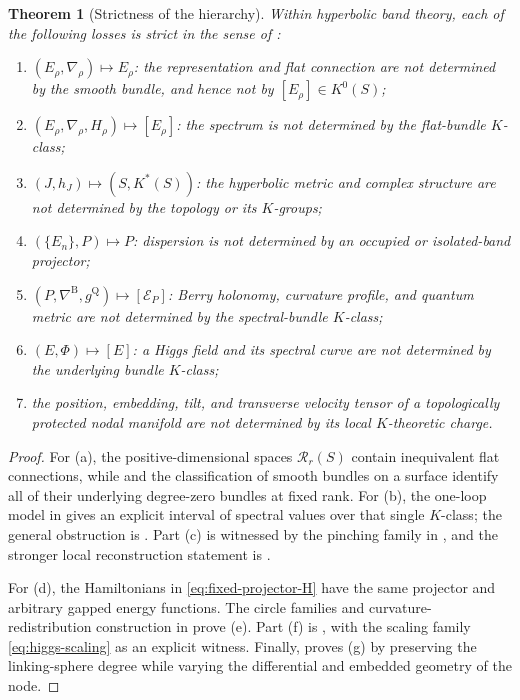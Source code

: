 \documentclass[11pt]{article}
\newtheorem{theorem}{Theorem}[section]
\theoremstyle{definition}
\theoremstyle{remark}
\newcommand{\cR}{\mathcal R}
\begin{document}
\begin{theorem}[Strictness of the hierarchy]
\label{thm:strict-hierarchy}
Within hyperbolic band theory, each of the following losses is strict in the
sense of :

\begin{enumerate}[label=\textup{(\alph*)},leftmargin=2.5em]
\item \((E_\rho,\nabla_\rho)\mapsto E_\rho\): the representation and flat
  connection are not determined by the smooth bundle, and hence not by
  \([E_\rho]\in K^0(S)\);
\item \((E_\rho,\nabla_\rho,H_\rho)\mapsto[E_\rho]\): the spectrum is not
  determined by the flat-bundle \(K\)-class;
\item \((J,h_J)\mapsto(S,K^*(S))\): the hyperbolic metric and complex
  structure are not determined by the topology or its \(K\)-groups;
\item \((\{E_n\},P)\mapsto P\): dispersion is not determined by an occupied
  or isolated-band projector;
\item \((P,\nabla^{\mathrm B},g^{\mathrm Q})\mapsto[\mathscr E_P]\): Berry
  holonomy, curvature profile, and quantum metric are not determined by the
  spectral-bundle \(K\)-class;
\item \((E,\Phi)\mapsto[E]\): a Higgs field and its spectral curve are not
  determined by the underlying bundle \(K\)-class;
\item the position, embedding, tilt, and transverse velocity tensor of a
  topologically protected nodal manifold are not determined by its local
  \(K\)-theoretic charge.
\end{enumerate}
\end{theorem}

\begin{proof}
For \textup{(a)}, the positive-dimensional spaces \(\cR_r(S)\) contain
inequivalent flat connections, while  and the
classification of smooth bundles on a surface identify all of their
underlying degree-zero bundles at fixed rank.  For \textup{(b)}, the
one-loop model in  gives an explicit interval of spectral
values over that single \(K\)-class; the general obstruction is
.  Part \textup{(c)} is witnessed by the
pinching family in , and the stronger local
reconstruction statement is .

For \textup{(d)}, the Hamiltonians in
\eqref{eq:fixed-projector-H} have the same projector and arbitrary gapped
energy functions.  The circle families and curvature-redistribution
construction in  prove \textup{(e)}.  Part \textup{(f)}
is , with the scaling family
\eqref{eq:higgs-scaling} as an explicit witness.  Finally,
 proves \textup{(g)} by preserving the
linking-sphere degree while varying the differential and embedded geometry
of the node.
\end{proof}
\end{document}
